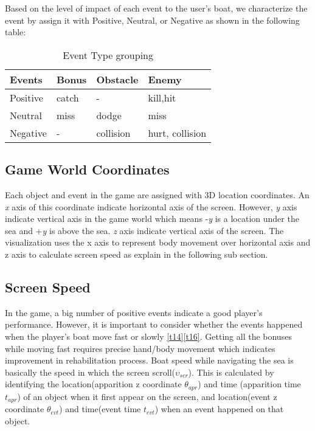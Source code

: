 Based on the level of impact of each event to the user's boat, we characterize the event by assign it with Positive, Neutral, or Negative as shown in the following table:
\begin{table}[h]
\begin{center}
    \begin{tabular}{| l | l | l | l |}
    \hline
    Events & Bonus & Obstacle & Enemy \\ \hline
    Positive & catch & - & kill,hit\\ \hline
    Neutral & miss & dodge & miss\\ \hline
    Negative & - & collision & hurt, collision\\
    \hline
    \end{tabular}
    \caption {Event Type grouping}
\end{center}
\end{table}

\subsection{Game World Coordinates}
Each object and event in the game are assigned with 3D location coordinates. An \textit{x} axis of this coordinate indicate horizontal axis of the screen. However, \textit{y} axis indicate vertical axis in the game world which means -\textit{y} is a location under the sea and +\textit{y} is above the sea. \textit{z} axis indicate vertical axis of the screen. The visualization uses the x axis to represent body movement over horizontal axis and z axis to calculate screen speed as explain in the following sub section.

\subsection{Screen Speed}
In the game, a big number of positive events indicate a good player's performance. However, it is important to consider whether the events happened when the player's boat move fast or slowly \ref{t14}\ref{t16}. Getting all the bonuses while moving fast requires precise hand/body movement which indicates improvement in rehabilitation process. Boat speed while navigating the sea is basically the speed in which the screen scroll($\upsilon_{scr}$). This is calculated by identifying the location(apparition z coordinate $\theta_{apr}$) and time (apparition time $\textit{t}_{apr}$) of an object when it first appear on the screen, and location(event z coordinate $\theta_{evt}$) and time(event time $\textit{t}_{evt}$) when an event happened on that object.

